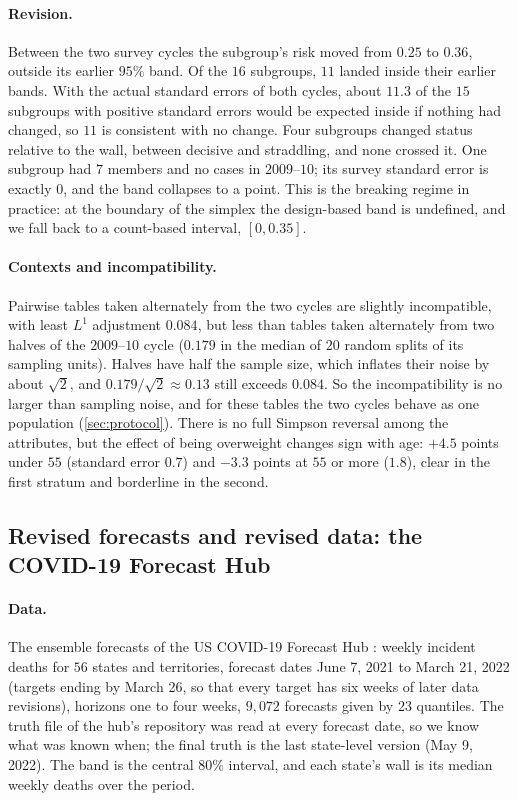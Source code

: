 \documentclass[11pt]{article}
\theoremstyle{definition}
\theoremstyle{remark}
\begin{document}
\paragraph{Revision.} Between the two survey cycles the subgroup's risk moved from $0.25$ to $0.36$, outside its earlier $95\%$ band.
Of the $16$ subgroups, $11$ landed inside their earlier bands. With the actual standard errors of both cycles, about $11.3$ of
the $15$ subgroups with positive standard errors would be expected inside if nothing had changed, so $11$ is consistent with no
change. Four subgroups changed status relative to the wall, between decisive and straddling, and none crossed it. One subgroup had $7$ members and no cases in $2009$--$10$; its survey standard error is
exactly $0$, and the band collapses to a point. This is the breaking regime in practice: at the boundary of the simplex the
design-based band is undefined, and we fall back to a count-based interval, $[0,0.35]$.

\paragraph{Contexts and incompatibility.} Pairwise tables taken alternately from the two cycles are slightly incompatible, with least
$L^1$ adjustment $0.084$, but less than tables taken alternately from two halves of the $2009$--$10$ cycle ($0.179$ in the
median of $20$ random splits of its sampling units). Halves have half the sample size, which inflates their noise by about $\sqrt2$, and $0.179/\sqrt2\approx0.13$ still
exceeds $0.084$. So the incompatibility is no larger than sampling noise, and for these tables the two cycles behave as one
population (\cref{sec:protocol}). There is no full Simpson reversal among the
attributes, but the effect of being overweight changes sign with age: $+4.5$ points under $55$ (standard error $0.7$) and $-3.3$
points at $55$ or more ($1.8$), clear in the first stratum and borderline in the second.

\subsection{Revised forecasts and revised data: the COVID-19 Forecast Hub}\label{sec:fhub}

\paragraph{Data.} The ensemble forecasts of the US COVID-19 Forecast Hub \cite{Cramer2022}: weekly incident deaths for $56$ states
and territories, forecast dates June 7, 2021 to March 21, 2022 (targets ending by March 26, so that every target has six weeks of
later data revisions), horizons one to four weeks, $9{,}072$ forecasts given by $23$ quantiles. The truth file of the hub's repository was read at every forecast date, so we know what was known when; the final
truth is the last state-level version (May 9, 2022). The band is the central $80\%$ interval, and each state's wall is its median
weekly deaths over the period.
\end{document}
